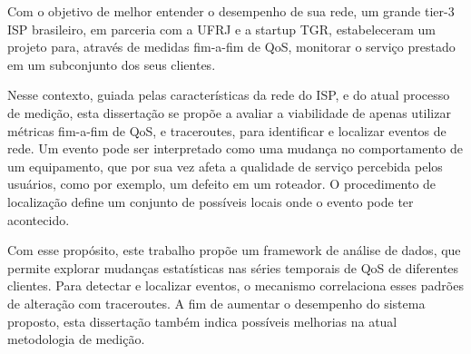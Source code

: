 Com o objetivo de melhor entender o desempenho de sua rede,
um grande tier-3 ISP brasileiro, em parceria com a UFRJ e a startup TGR,
estabeleceram um projeto para, atrav\'es de medidas fim-a-fim de QoS,
monitorar o servi\c{c}o prestado em um subconjunto dos seus clientes.

Nesse contexto, guiada pelas caracter\'isticas da rede do ISP, e do atual
processo de medi\c{c}\~ao, esta disserta\c{c}\~ao se prop\~oe a
avaliar a viabilidade de apenas utilizar m\'etricas fim-a-fim de QoS, e
traceroutes, para identificar e localizar eventos de rede. Um evento pode ser
interpretado como uma mudan\c{c}a no comportamento de um equipamento, que por
sua vez afeta a qualidade de servi\c{c}o percebida pelos usu\'arios,
como por exemplo, um defeito em um roteador.
O procedimento de localiza\c{c}\~ao define um conjunto de poss\'iveis
locais onde o evento pode ter acontecido.

Com esse prop\'osito, este trabalho prop\~oe um framework de an\'alise de dados,
que permite explorar mudan\c{c}as estat\'isticas nas s\'eries temporais de QoS
de diferentes clientes. Para detectar e localizar eventos, o mecanismo
correlaciona esses padr\~oes de altera\c{c}\~ao com traceroutes.
A fim de aumentar o
desempenho do sistema proposto, esta disserta\c{c}\~ao tamb\'em indica
poss\'iveis melhorias na atual metodologia de medi\c{c}\~ao.
